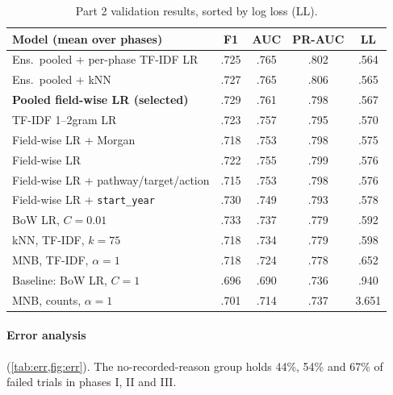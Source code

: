 \begin{table}[t]
\centering
\footnotesize
\setlength{\tabcolsep}{3pt}
\begin{tabular}{@{}lcccc@{}}
\toprule
Model (mean over phases) & F1 & AUC & PR-AUC & LL \\
\midrule
Ens.\ pooled + per-phase TF-IDF LR & .725 & .765 & .802 & .564 \\
Ens.\ pooled + kNN & .727 & .765 & .806 & .565 \\
\textbf{Pooled field-wise LR (selected)} & .729 & .761 & .798 & .567 \\
TF-IDF 1--2gram LR & .723 & .757 & .795 & .570 \\
Field-wise LR + Morgan & .718 & .753 & .798 & .575 \\
Field-wise LR & .722 & .755 & .799 & .576 \\
Field-wise LR + pathway/target/action & .715 & .753 & .798 & .576 \\
Field-wise LR + \texttt{start\_year} & .730 & .749 & .793 & .578 \\
BoW LR, $C=0.01$ & .733 & .737 & .779 & .592 \\
kNN, TF-IDF, $k=75$ & .718 & .734 & .779 & .598 \\
MNB, TF-IDF, $\alpha=1$ & .718 & .724 & .778 & .652 \\
Baseline: BoW LR, $C=1$ & .696 & .690 & .736 & .940 \\
MNB, counts, $\alpha=1$ & .701 & .714 & .737 & 3.651 \\
\bottomrule
\end{tabular}
\caption{Part 2 validation results, sorted by log loss (LL).}
\label{tab:p2all}
\end{table}

\paragraph{Error analysis} (\cref{tab:err,fig:err}).
The no-recorded-reason group holds 44\%, 54\% and 67\% of failed trials in phases I, II and III.

